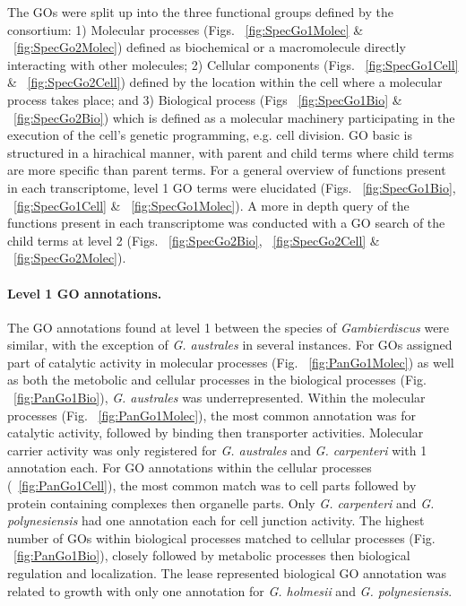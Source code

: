 \documentclass[12pt]{article}
\begin{document}
The GOs were split up into the three functional groups defined by the consortium: 1) Molecular processes (Figs. ~\ref{fig:SpecGo1Molec} \& ~\ref{fig:SpecGo2Molec}) defined as biochemical or a macromolecule directly interacting with other molecules; 2) Cellular components (Figs. ~\ref{fig:SpecGo1Cell} \& ~\ref{fig:SpecGo2Cell}) defined by the location within the cell where a molecular process takes place; and 3) Biological process (Figs ~\ref{fig:SpecGo1Bio} \& ~\ref{fig:SpecGo2Bio}) which is defined as a molecular machinery participating in the execution of the cell's genetic programming, e.g. cell division.
GO basic is structured in a hirachical manner, with parent and child terms where child terms are more specific than parent terms. 
For a general overview of functions present in each transcriptome, level 1 GO terms were elucidated (Figs. ~\ref{fig:SpecGo1Bio}, ~\ref{fig:SpecGo1Cell} \& ~\ref{fig:SpecGo1Molec}). 
A more in depth query of the functions present in each transcriptome was conducted with a GO search of the child terms at level 2 (Figs. ~\ref{fig:SpecGo2Bio}, ~\ref{fig:SpecGo2Cell} \& ~\ref{fig:SpecGo2Molec}). 

\paragraph{Level 1 GO annotations.}
\FloatBarrier
The GO annotations found at level 1 between the species of \textit{Gambierdiscus} were similar, with the exception of \textit{G. australes} in several instances. 
For GOs assigned part of catalytic activity in molecular processes (Fig. ~\ref{fig:PanGo1Molec}) as well as both the metobolic and cellular processes in the biological processes (Fig. ~\ref{fig:PanGo1Bio}), \textit{G. australes} was underrepresented. 
Within the molecular processes (Fig. ~\ref{fig:PanGo1Molec}), the most common annotation was for catalytic activity, followed by binding then transporter activities. 
Molecular carrier activity was only registered for \textit{G. australes} and \textit{G. carpenteri} with 1 annotation each.
For GO annotations within the cellular processes (~\ref{fig:PanGo1Cell}), the most common match was to cell parts followed by protein containing complexes then organelle parts. 
Only \textit{G. carpenteri} and \textit{G. polynesiensis} had one annotation each for cell junction activity. 
The highest number of GOs within biological processes matched to cellular processes (Fig. ~\ref{fig:PanGo1Bio}), closely followed by metabolic processes then biological regulation and localization. 
The lease represented biological GO annotation was related to growth with only one annotation for \textit{G. holmesii} and \textit{G. polynesiensis}.
\end{document}
